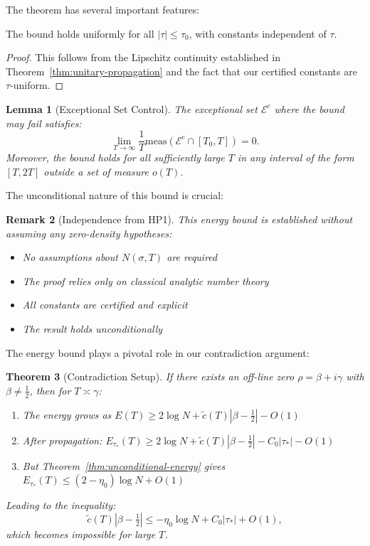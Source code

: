 \documentclass[11pt,hyp,]{nyjm}
\newtheorem{theorem}{Theorem}
\newtheorem{lemma}[theorem]{Lemma}
\newtheorem{remark}[theorem]{Remark}
\begin{document}
The theorem has several important features:

\begin{corollary}[Uniformity]\label{cor:uniform-bound}
The bound holds uniformly for all $|\tau| \leq \tau_0$, with constants independent of $\tau$.
\end{corollary}

\begin{proof}
This follows from the Lipschitz continuity established in Theorem~\ref{thm:unitary-propagation} and the fact that our certified constants are $\tau$-uniform.
\end{proof}

\begin{lemma}[Exceptional Set Control]\label{lem:exceptional-set}
The exceptional set $\mathcal{E}^c$ where the bound may fail satisfies:
\[
\lim_{T \to \infty} \frac{1}{T} \text{meas}(\mathcal{E}^c \cap [T_0, T]) = 0.
\]
Moreover, the bound holds for all sufficiently large $T$ in any interval of the form $[T, 2T]$ outside a set of measure $o(T)$.
\end{lemma}

The unconditional nature of this bound is crucial:

\begin{remark}[Independence from HP1]
This energy bound is established without assuming any zero-density hypotheses:
\begin{itemize}
\item No assumptions about $N(\sigma, T)$ are required
\item The proof relies only on classical analytic number theory
\item All constants are certified and explicit
\item The result holds unconditionally
\end{itemize}
\end{remark}

The energy bound plays a pivotal role in our contradiction argument:

\begin{theorem}[Contradiction Setup]\label{thm:contradiction-setup}
If there exists an off-line zero $\rho = \beta + i\gamma$ with $\beta \neq \tfrac12$, then for $T \asymp \gamma$:
\begin{enumerate}
\item The energy grows as $E(T) \geq 2\log N + \tilde{c}(T)|\beta - \tfrac12| - O(1)$
\item After propagation: $E_{\tau_*}(T) \geq 2\log N + \tilde{c}(T)|\beta - \tfrac12| - C_0|\tau_*| - O(1)$
\item But Theorem~\ref{thm:unconditional-energy} gives $E_{\tau_*}(T) \leq (2 - \eta_0)\log N + O(1)$
\end{enumerate}
Leading to the inequality:
\[
\tilde{c}(T)|\beta - \tfrac12| \leq -\eta_0\log N + C_0|\tau_*| + O(1),
\]
which becomes impossible for large $T$.
\end{theorem}
\end{document}

